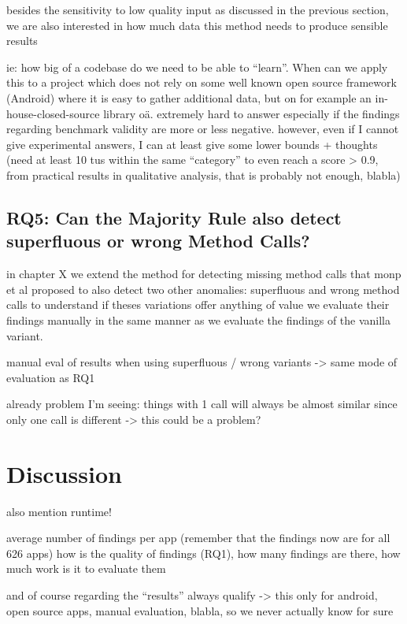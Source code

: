 besides the sensitivity to low quality input as discussed in the previous section, we are also interested in how much data this method needs to produce sensible results

ie: how big of a codebase do we need to be able to ``learn''. When can we apply this to a project which does not rely on some well known open source framework (Android) where it is easy to gather additional data, but on for example an in-house-closed-source library oä.
extremely hard to answer especially if the findings regarding benchmark validity are more or less negative.
however, even if I cannot give experimental answers, I can at least give some lower bounds + thoughts
(need at least 10 tus within the same ``category'' to even reach a score > 0.9, from practical results in qualitative analysis, that is probably not enough, blabla)


\subsection{RQ5: Can the Majority Rule also detect superfluous or wrong Method Calls?}

in chapter X we extend the method for detecting missing method calls that monp et al proposed to also detect two other anomalies:
superfluous and wrong method calls
to understand if theses variations offer anything of value we evaluate their findings manually in the same manner as we evaluate the findings of the vanilla variant.

manual eval of results when using superfluous / wrong variants
-> same mode of evaluation as RQ1

already problem I'm seeing: things with 1 call will always be almost similar since only one call is different
 -> this could be a problem?

\section{Discussion}

also mention runtime!

average number of findings per app (remember that the findings now are for all 626 apps)
how is the quality of findings (RQ1), how many findings are there, how much work is it to evaluate them

and of course regarding the ``results'' always qualify -> this only for android, open source apps, manual evaluation, blabla, so we never actually know for sure

